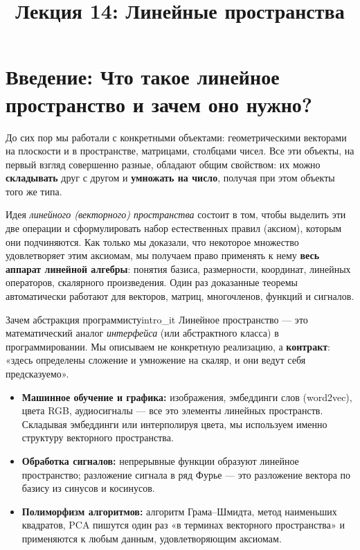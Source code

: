 \documentclass[12pt,a4paper]{article}
\title{Лекция 14: Линейные пространства}
\author{}
\date{}
\begin{document}
\maketitle
\setcounter{section}{14}

\section*{Введение: Что такое линейное пространство и зачем оно нужно?}

До сих пор мы работали с конкретными объектами: геометрическими
векторами на плоскости и в пространстве, матрицами, столбцами чисел.
Все эти объекты, на первый взгляд совершенно разные, обладают общим
свойством: их можно \textbf{складывать} друг с другом и
\textbf{умножать на число}, получая при этом объекты того же типа.

Идея \emph{линейного (векторного) пространства} состоит в том, чтобы
выделить эти две операции и сформулировать набор естественных правил
(аксиом), которым они подчиняются. Как только мы доказали, что
некоторое множество удовлетворяет этим аксиомам, мы получаем право
применять к нему \textbf{весь аппарат линейной алгебры}: понятия
базиса, размерности, координат, линейных операторов, скалярного
произведения. Один раз доказанные теоремы автоматически работают для
векторов, матриц, многочленов, функций и сигналов.

\begin{remarkIT}{Зачем абстракция программисту}{intro_it}
  Линейное пространство — это математический аналог \emph{интерфейса}
  (или абстрактного класса) в программировании. Мы описываем не
  конкретную реализацию, а \textbf{контракт}: «здесь определены
  сложение и умножение на скаляр, и они ведут себя предсказуемо».
  \begin{itemize}
    \item \textbf{Машинное обучение и графика:} изображения, эмбеддинги
      слов (word2vec), цвета RGB, аудиосигналы — все это элементы
      линейных пространств. Складывая эмбеддинги или интерполируя цвета,
      мы используем именно структуру векторного пространства.
    \item \textbf{Обработка сигналов:} непрерывные функции образуют
      линейное пространство; разложение сигнала в ряд Фурье — это
      разложение вектора по базису из синусов и косинусов.
    \item \textbf{Полиморфизм алгоритмов:} алгоритм Грама–Шмидта, метод
      наименьших квадратов, PCA пишутся один раз «в терминах векторного
      пространства» и применяются к любым данным, удовлетворяющим аксиомам.
  \end{itemize}
\end{remarkIT}
\end{document}

